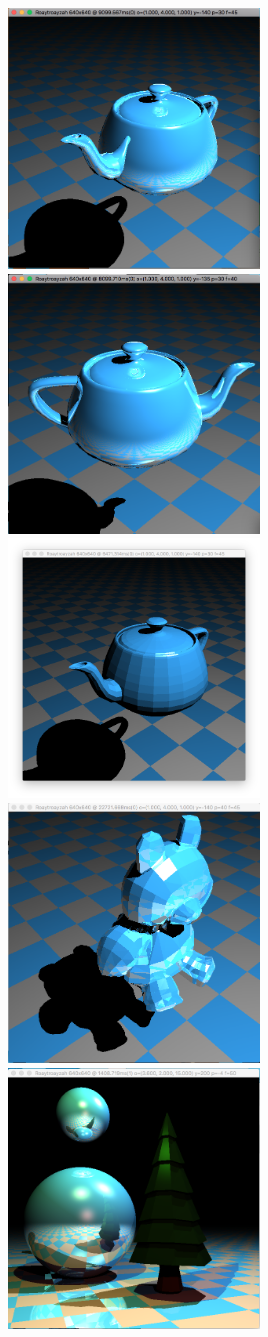 \includegraphics[width=0.5\textwidth]{img/smoothTeapot1}
\includegraphics[width=0.5\textwidth]{img/smoothTeapot2}
\includegraphics[width=0.5\textwidth]{img/solidTeapot}
\includegraphics[width=0.5\textwidth]{img/teddy}
\includegraphics[width=0.5\textwidth]{img/treeSpheres}
